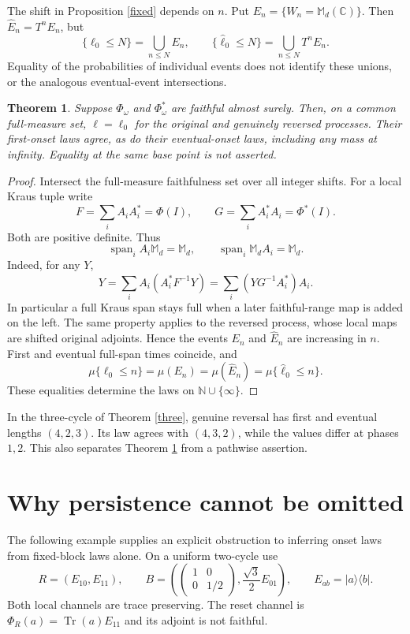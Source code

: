 \documentclass[11pt,a4paper]{article}
\newtheorem{theorem}{Theorem}
\newcommand{\M}{\mathbb M_d(\mathbb C)}
\newcommand{\Span}{\operatorname{span}}
\newcommand{\tr}{\operatorname{Tr}}
\begin{document}
The shift in Proposition \ref{fixed} depends on $n$. Put $E_n=\{W_n=\M\}$. Then
$\widehat E_n=T^nE_n$, but
\[
 \{\ell_0\leq N\}=\bigcup_{n\leq N}E_n,\qquad
 \{\widehat\ell_0\leq N\}=\bigcup_{n\leq N}T^nE_n.
\]
Equality of the probabilities of individual events does not identify these unions, or the analogous eventual-event intersections.

\begin{theorem}\label{law}
Suppose $\Phi_\omega$ and $\Phi_\omega^*$ are faithful almost surely. Then, on a common full-measure set, $\ell=\ell_0$ for the original and genuinely reversed processes. Their first-onset laws agree, as do their eventual-onset laws, including any mass at infinity. Equality at the same base point is not asserted.
\end{theorem}
\begin{proof}
Intersect the full-measure faithfulness set over all integer shifts. For a local Kraus tuple write
\[
 F=\sum_i A_iA_i^*=\Phi(I),\qquad G=\sum_i A_i^*A_i=\Phi^*(I).
\]
Both are positive definite. Thus
\[
 \Span_i A_i\mathbb M_d=\mathbb M_d,\qquad
 \Span_i\mathbb M_dA_i=\mathbb M_d.
\]
Indeed, for any $Y$,
\[
 Y=\sum_i A_i(A_i^*F^{-1}Y)
   =\sum_i(YG^{-1}A_i^*)A_i.
\]
In particular a full Kraus span stays full when a later faithful-range map is added on the left. The same property applies to the reversed process, whose local maps are shifted original adjoints. Hence the events $E_n$ and $\widehat E_n$ are increasing in $n$. First and eventual full-span times coincide, and
\[
 \mu\{\ell_0\leq n\}=\mu(E_n)=\mu(\widehat E_n)
 =\mu\{\widehat\ell_0\leq n\}.
\]
These equalities determine the laws on $\mathbb N\cup\{\infty\}$.
\end{proof}

In the three-cycle of Theorem \ref{three}, genuine reversal has first and eventual lengths $(4,2,3)$. Its law agrees with $(4,3,2)$, while the values differ at phases $1,2$. This also separates Theorem \ref{law} from a pathwise assertion.

\section{Why persistence cannot be omitted}
The following example supplies an explicit obstruction to inferring onset laws from fixed-block laws alone. On a uniform two-cycle use
\[
 R=(E_{10},E_{11}),\qquad
 B=\left(\begin{pmatrix}1&0\\0&1/2\end{pmatrix},
                 \frac{\sqrt3}{2}E_{01}\right),
 \qquad E_{ab}=|a\rangle\langle b|.
\]
Both local channels are trace preserving. The reset channel is
$\Phi_R(a)=\tr(a)E_{11}$ and its adjoint is not faithful.
\end{document}
